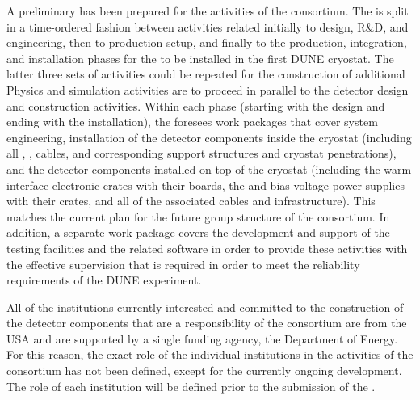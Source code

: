 A preliminary  has been prepared for the activities
of the  consortium. The  is split in a time-ordered fashion
between activities related initially to design, R\&D, and engineering, then
to production setup, and finally to the production, integration, and installation
phases for the  to be installed in the first DUNE cryostat.
The latter three sets of activities could be repeated for the construction
of additional  %
Physics and simulation
activities are to proceed in parallel to the detector design and construction activities.
Within each phase (starting with the design and ending with the installation),
the  foresees work packages that cover system engineering, installation of the detector
components inside the cryostat (including all , ,
cables, and corresponding support structures and cryostat penetrations),
and the detector components installed on top of the cryostat (including the warm
interface electronic crates with their boards, the  and bias-voltage
power supplies with their crates, and all of the associated cables and infrastructure). This
matches the current plan for the future group structure of the  consortium. 
In addition, a separate work package covers the development and support of the testing facilities and the related software in order to provide these activities with the effective supervision that is required in order to meet the reliability requirements of the DUNE experiment.

All of the institutions currently interested and committed to the construction of
the detector components that are a responsibility of the 
consortium are from the USA and are supported by a single
funding agency, the Department of Energy. For this reason, the exact role of
the individual institutions in the activities of the consortium has not been
defined, except for the currently ongoing  development. The role of
each institution will be defined prior to the submission of the .
